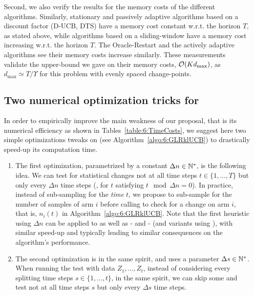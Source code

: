 Second, we also verify the results for the memory costs of the different algorithms.
Similarly, stationary and passively adaptive algorithms based on a discount factor (D-UCB, DTS) have a memory cost constant w.r.t. the horizon $T$, as stated above,
while algorithms based on a sliding-window have a memory cost increasing w.r.t. the horizon $T$.
The Oracle-Restart and the actively adaptive algorithms see their memory costs increase similarly.
These measurements validate the upper-bound we gave on their memory costs, $\mathop{}\mathopen{}\mathcal{O}\mathopen{}\left(K d_{\max}\right)$, as $d_{\max} \simeq T / \Upsilon$ for this problem with evenly spaced change-points.


\subsection{Two numerical optimization tricks for \GLRklUCB}\label{sub:6:IdeasOptimizations}

In order to empirically improve the main weakness of our proposal, that is its numerical efficiency as shown in Tables~\ref{table:6:TimeCosts},
we suggest here two simple optimizations tweaks on \GLRklUCB{} (see Algorithm~\ref{algo:6:GLRklUCB}) to drastically speed-up its computation time.

\begin{enumerate}
    \item
    The first optimization, parametrized by a constant $\Delta n \in\mathbb{N}^*$, is the following idea.
    We can test for statistical changes not at all time steps $t\in\{1,\dots,T\}$ but only every $\Delta n$ time steps (\ie, for $t$ satisfying $t \mod \Delta n = 0$).
    In practice, instead of sub-sampling for the \emph{time} $t$, we propose to sub-sample for the number of samples of arm $i$ before calling \GLR{} to check for a change on arm $i$, that is, $n_i(t)$ in Algorithm~\ref{algo:6:GLRklUCB}.
    Note that the first heuristic using $\Delta n$ can be applied to \MUCB{} as well as \CUSUM-\UCB{} and \PHT-\UCB{} (and variants using \klUCB), with similar speed-up and typically leading to similar consequences on the algorithm's performance.

    \item
    The second optimization is in the same spirit, and uses a parameter $\Delta s \in\mathbb{N}^*$.
    When running the \GLR{} test with data $Z_1,\dots,Z_t$, instead of considering every splitting time steps $s\in\{1,\dots,t\}$, in the same spirit, we can skip some and test not at all time steps $s$ but only every $\Delta s$ time steps.
\end{enumerate}


